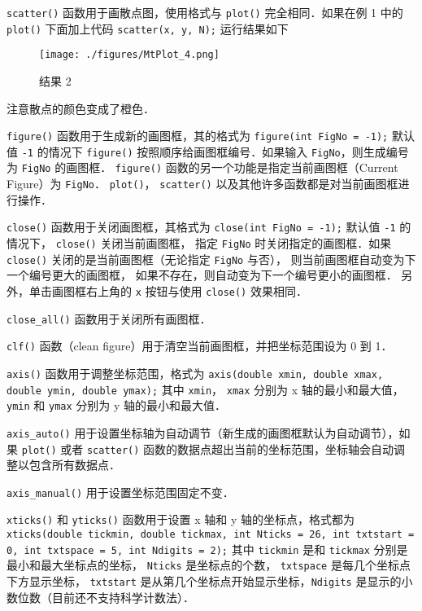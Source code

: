 \verb|scatter()| 函数用于画散点图，使用格式与 \verb|plot()| 完全相同．如果在例 1 中的 \verb|plot()| 下面加上代码
\verb|scatter(x, y, N);|
运行结果如下

\begin{figure}[ht]
\centering
\texttt{[image: ./figures/MtPlot\_4.png]}
\caption{结果 2} \label{MtPlot_fig4}
\end{figure}

注意散点的颜色变成了橙色．

\verb|figure()| 函数用于生成新的画图框，其的格式为
\verb|figure(int FigNo = -1);|
默认值 \verb|-1| 的情况下 \verb|figure()| 按照顺序给画图框编号．如果输入 \verb|FigNo|，则生成编号为 \verb|FigNo| 的画图框． \verb|figure()| 函数的另一个功能是指定当前画图框（Current Figure）为 \verb|FigNo|． \verb|plot()|， \verb|scatter()| 以及其他许多函数都是对当前画图框进行操作．

\verb|close()| 函数用于关闭画图框，其格式为
\verb|close(int FigNo = -1);|
默认值 \verb|-1| 的情况下， \verb|close()| 关闭当前画图框， 指定 \verb|FigNo| 时关闭指定的画图框．如果 \verb|close()| 关闭的是当前画图框（无论指定 \verb|FigNo| 与否）， 则当前画图框自动变为下一个编号更大的画图框， 如果不存在，则自动变为下一个编号更小的画图框． 另外，单击画图框右上角的 \verb|x| 按钮与使用 \verb|close()| 效果相同．

\verb|close_all()| 函数用于关闭所有画图框．

\verb|clf()| 函数（clean figure）用于清空当前画图框，并把坐标范围设为 0 到 1．

\verb|axis()| 函数用于调整坐标范围，格式为
\verb|axis(double xmin, double xmax, double ymin, double ymax);|
其中 \verb|xmin|， \verb|xmax| 分别为 x 轴的最小和最大值， \verb|ymin| 和 \verb|ymax| 分别为 y 轴的最小和最大值．

\verb|axis_auto()| 用于设置坐标轴为自动调节（新生成的画图框默认为自动调节），如果 \verb|plot()| 或者 \verb|scatter()| 函数的数据点超出当前的坐标范围，坐标轴会自动调整以包含所有数据点．

\verb|axis_manual()| 用于设置坐标范围固定不变．

\verb|xticks()| 和 \verb|yticks()| 函数用于设置 x 轴和 y 轴的坐标点，格式都为
\verb|xticks(double tickmin, double tickmax, int Nticks = 26, int txtstart = 0, int txtspace = 5, int Ndigits = 2);|
其中 \verb|tickmin| 是和 \verb|tickmax| 分别是最小和最大坐标点的坐标， \verb|Nticks| 是坐标点的个数， \verb|txtspace| 是每几个坐标点下方显示坐标， \verb|txtstart| 是从第几个坐标点开始显示坐标，\verb|Ndigits| 是显示的小数位数（目前还不支持科学计数法）．

